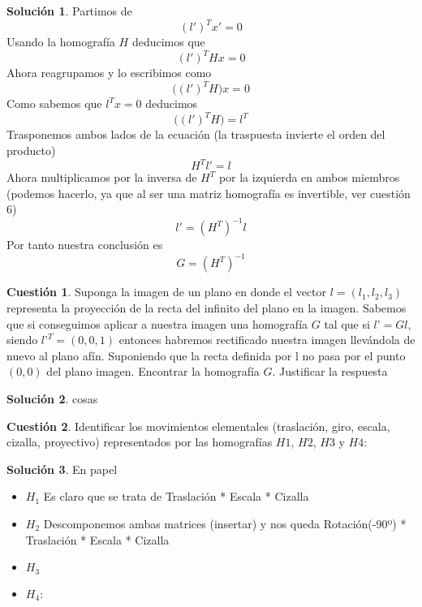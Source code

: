 \documentclass[a4paper, 11pt]{article}
\theoremstyle{definition}
\newtheorem{cuestion}{Cuestión}
\newtheorem*{solucion}{Solución}
\begin{document}
  \begin{solucion}
      Partimos de
      $$(l')^T x' = 0$$
      Usando la homografía $H$ deducimos que
      $$(l')^T Hx = 0$$
      Ahora reagrupamos y lo escribimos como
      $$\big((l')^T H\big)x = 0$$
      Como sabemos que $l^T x = 0$  deducimos
      $$\big((l')^T H\big) = l^T$$
      Trasponemos ambos lados de la ecuación (la traspuesta invierte el orden del producto)
      $$H^T l' = l$$
      Ahora multiplicamos por la inversa de $H^T$ por la izquierda en ambos miembros
      (podemos hacerlo, ya que al ser una matriz homografía es invertible, ver cuestión
      6)
      $$l' = (H^T)^{-1} l$$
      Por tanto nuestra conclusión es
      $$G = (H^T)^{-1}$$
  \end{solucion}

  \begin{cuestion}
    Suponga la imagen de un plano en donde el vector $l=(l_1,l_2,l_3)$ representa
    la proyección de la recta del infinito del plano en la imagen. Sabemos que si
    conseguimos aplicar a nuestra imagen una homografía $G$ tal que si $l’= Gl$, siendo
    $l’^T =(0,0,1)$ entonces habremos rectificado nuestra imagen llevándola de nuevo
    al plano afín. Suponiendo que la recta definida por l no pasa por el punto $(0,0)$
    del plano imagen. Encontrar la homografía $G$. Justificar la respuesta

  \end{cuestion}

  \begin{solucion}
    cosas
  \end{solucion}

  \begin{cuestion}
    Identificar los movimientos elementales (traslación, giro, escala,
    cizalla, proyectivo) representados por las homografías $H1$, $H2$, $H3$ y $H4$:

  \end{cuestion}

  \begin{solucion}
    En papel
      \begin{itemize}
        \item $H_1$
          Es claro que se trata de Traslación * Escala * Cizalla
        \item $H_2$
          Descomponemos ambas matrices (insertar) y nos queda Rotación(-90º) * Traslación * Escala * Cizalla
        \item $H_3$

        \item $H_4$:
      \end{itemize}
  \end{solucion}
\end{document}
